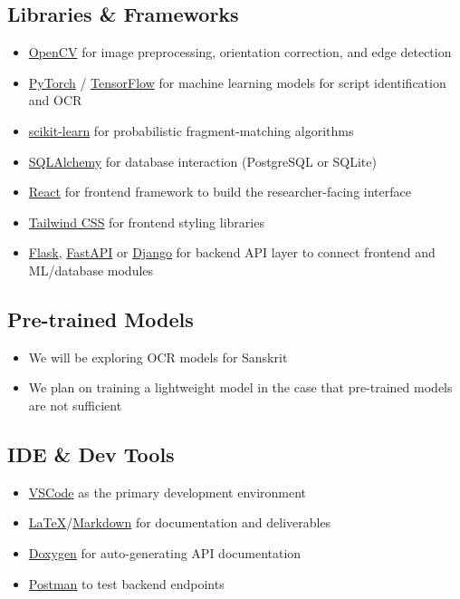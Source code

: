 \documentclass{article}
\begin{document}
\subsection*{Libraries \& Frameworks}
\begin{itemize}
    \item \href{https://opencv.org/}{OpenCV} for image preprocessing, orientation correction, and edge detection
    \item \href{https://pytorch.org/}{PyTorch} / \href{https://www.tensorflow.org/}{TensorFlow} for machine learning models for script identification and OCR
    \item \href{https://scikit-learn.org/}{scikit-learn} for probabilistic fragment-matching algorithms
    \item \href{https://www.sqlalchemy.org/}{SQLAlchemy} for database interaction (PostgreSQL or SQLite)
    \item \href{https://reactjs.org/}{React} for frontend framework to build the researcher-facing interface
    \item \href{https://tailwindcss.com/}{Tailwind CSS} for frontend styling libraries
    \item \href{https://flask.palletsprojects.com/}{Flask}, \href{https://fastapi.tiangolo.com/}{FastAPI} or \href{https://www.djangoproject.com/}{Django} for backend API layer to connect frontend and ML/database modules
\end{itemize}

\subsection*{Pre-trained Models}
\begin{itemize}
    \item We will be exploring OCR models for Sanskrit
    \item We plan on training a lightweight model in the case that pre-trained models are not sufficient
\end{itemize}

\subsection*{IDE \& Dev Tools}
\begin{itemize}
    \item \href{https://code.visualstudio.com/}{VSCode} as the primary development environment
    \item \href{https://www.latex-project.org/}{\LaTeX{}}/\href{https://daringfireball.net/projects/markdown/}{Markdown} for documentation and deliverables
    \item \href{https://www.doxygen.nl/}{Doxygen} for auto-generating API documentation
    \item \href{https://www.postman.com/}{Postman} to test backend endpoints
\end{itemize}
\end{document}

